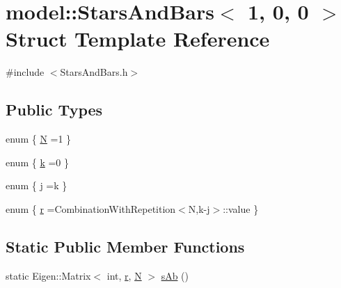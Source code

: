 \hypertarget{structmodel_1_1_stars_and_bars_3_011_00_010_00_010_01_4}{}\section{model\+:\+:Stars\+And\+Bars$<$ 1, 0, 0 $>$ Struct Template Reference}
\label{structmodel_1_1_stars_and_bars_3_011_00_010_00_010_01_4}


{\ttfamily \#include $<$Stars\+And\+Bars.\+h$>$}

\subsection*{Public Types}
\begin{DoxyCompactItemize}
\item 
enum \{ \hyperlink{structmodel_1_1_stars_and_bars_3_011_00_010_00_010_01_4_ae1ce65e5986ff7b10dcb3ab6c5aaec18a858931e33a777c10210460c11faa4a54}{N} =1
 \}
\item 
enum \{ \hyperlink{structmodel_1_1_stars_and_bars_3_011_00_010_00_010_01_4_ab148e28809d85c6fed4950ad5d4900e1a74380a5d8b192d41f2153f444c91c4d1}{k} =0
 \}
\item 
enum \{ \hyperlink{structmodel_1_1_stars_and_bars_3_011_00_010_00_010_01_4_a1a1c84cb8510de5c9c0639870d66cbbea7524557fe1b7f59ce0a36878b69b3f0b}{j} =k
 \}
\item 
enum \{ \hyperlink{structmodel_1_1_stars_and_bars_3_011_00_010_00_010_01_4_a55d040faed071bf4f35d6618061ceba1afeb7702f371e27e53f531231c103cce8}{r} =Combination\+With\+Repetition$<$N,k-\/j$>$\+:\+:value
 \}
\end{DoxyCompactItemize}
\subsection*{Static Public Member Functions}
\begin{DoxyCompactItemize}
\item 
static Eigen\+::\+Matrix$<$ int, \hyperlink{structmodel_1_1_stars_and_bars_3_011_00_010_00_010_01_4_a55d040faed071bf4f35d6618061ceba1afeb7702f371e27e53f531231c103cce8}{r}, \hyperlink{structmodel_1_1_stars_and_bars_3_011_00_010_00_010_01_4_ae1ce65e5986ff7b10dcb3ab6c5aaec18a858931e33a777c10210460c11faa4a54}{N} $>$ \hyperlink{structmodel_1_1_stars_and_bars_3_011_00_010_00_010_01_4_a34446658b72eb7349be9cbc0978e1070}{s\+Ab} ()
\end{DoxyCompactItemize}


